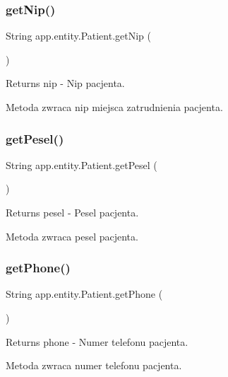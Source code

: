 \subsubsection{\texorpdfstring{getNip()}{getNip()}}
{\footnotesize\ttfamily String app.\+entity.\+Patient.\+get\+Nip (\begin{DoxyParamCaption}{ }\end{DoxyParamCaption})}

\begin{DoxyReturn}{Returns}
nip -\/ Nip pacjenta.
\end{DoxyReturn}
Metoda zwraca nip miejsca zatrudnienia pacjenta. \mbox{\label{classapp_1_1entity_1_1_patient_ac9b8982afe39f13b4d468c6aed8af062}} 
\subsubsection{\texorpdfstring{getPesel()}{getPesel()}}
{\footnotesize\ttfamily String app.\+entity.\+Patient.\+get\+Pesel (\begin{DoxyParamCaption}{ }\end{DoxyParamCaption})}

\begin{DoxyReturn}{Returns}
pesel -\/ Pesel pacjenta.
\end{DoxyReturn}
Metoda zwraca pesel pacjenta. \mbox{\label{classapp_1_1entity_1_1_patient_a88fdb710e545deb3de9cb2c3e52982c0}} 
\subsubsection{\texorpdfstring{getPhone()}{getPhone()}}
{\footnotesize\ttfamily String app.\+entity.\+Patient.\+get\+Phone (\begin{DoxyParamCaption}{ }\end{DoxyParamCaption})}

\begin{DoxyReturn}{Returns}
phone -\/ Numer telefonu pacjenta.
\end{DoxyReturn}
Metoda zwraca numer telefonu pacjenta. \mbox{\label{classapp_1_1entity_1_1_patient_a852ffd3a2112972d4da97027fbb4ad5a}} 
